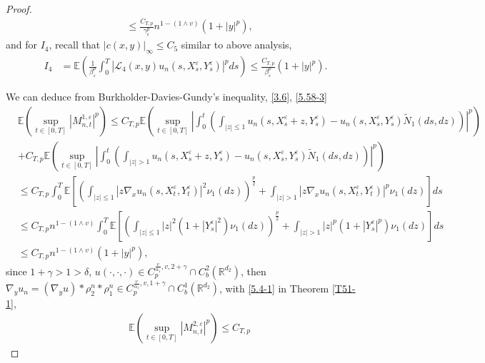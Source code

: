 \documentclass[11pt,reqno]{amsart}
\numberwithin{equation}{section}
\begin{document}
\begin{proof}
\begin{align}
		&\leq \frac{C_{T,p}}{\gamma_{\varepsilon}^{p}}n^{1-(1\wedge v)} (1+|y|^{p}),\label{5.51}
\end{align}
and for $I_{4}$, recall that $|c(x,y)|_{\infty} \leq C_{5}$ similar to above analysis,
\begin{equation}\label{5.52}
	\begin{split}
		I_{4}&=\mathbb{E}\left(\frac{1}{\beta_{\varepsilon}^{p}}\int_{0}^{T}|\mathcal{L}_{4}(x,y)u_{n}(s,X_{s}^{\varepsilon},Y_{s}^{\varepsilon})|^{p}ds\right)\leq  \frac{C_{T,p}}{\beta_{\varepsilon}^{p}} (1+|y|^{p}).
	\end{split}
\end{equation}

We can deduce from Burkholder-Davies-Gundy's inequality, \eqref{3.6}, \eqref{5.58-3}
\begin{align}
	&\mathbb{E}\left( \sup_{t\in [0,T]}|M_{n,t}^{1,\varepsilon}|^{p}\right)\leq C_{T,p}
	\mathbb{E}\left(\sup_{t\in [0,T]}\left| \int_{0}^{t}\left(\int_{|z|\leq 1}u_{n}(s,X_{s}^{\varepsilon}+z,Y_{s}^{\varepsilon})-u_{n}(s,X_{s}^{\varepsilon},Y_{s}^{\varepsilon})\tilde{N}_{1}(ds,dz) \right)\right| ^{p}\right)\nonumber\\
	&+ C_{T,p}
	\mathbb{E}\left(\sup_{t\in [0,T]}\left| \int_{0}^{t}\left(\int_{|z|> 1}u_{n}(s,X_{s}^{\varepsilon}+z,Y_{s}^{\varepsilon})-u_{n}(s,X_{s}^{\varepsilon},Y_{s}^{\varepsilon})\tilde{N}_{1}(ds,dz) \right)\right| ^{p}\right)\nonumber\\
	&\leq  C_{T,p}  \int_{0}^{T}\mathbb{E}\left[\left(\int_{|z|\leq 1}|z\nabla_{x} u_{n}(s,X_{t}^{\varepsilon},Y_{t}^{\varepsilon})|^{2}\nu_{1}(dz) \right)^{\frac{p}{2}}+\int_{|z|> 1}|z\nabla_{x} u_{n}(s,X_{t}^{\varepsilon},Y_{t}^{\varepsilon})|^{p}\nu_{1}(dz)\right]ds \nonumber\\
	&\leq C_{T,p}n^{1-(1\wedge v)}  \int_{0}^{T}\mathbb{E}\left[\left(\int_{|z|\leq 1}|z|^{2}(1+|Y_{s}^{\varepsilon}|^{2})\nu_{1}(dz) \right)^{\frac{p}{2}}+\int_{|z|> 1}|z|^{p}(1+|Y_{s}^{\varepsilon}|^{p})\nu_{1}(dz) \right]ds\nonumber\\
	& \leq C_{T,p}n^{1-(1\wedge v)}(1+|y|^{p}),\label{5.53}
\end{align}
  since $1+\gamma> 1> \delta$,   $ u(\cdot,\cdot,\cdot)\in C_{p}^{\frac{v}{\alpha_{1}},v, 2+\gamma}\cap C_{b}^{2}(\mathbb{R}^{d_{2}})$, then $ \nabla_{y}u_{n}=(\nabla_{y}u)\ast\rho_{2}^{n}\ast\rho_{1}^{n}\in C_{p}^{\frac{v}{\alpha_{1}},v, 1+\gamma}\cap C_{b}^{1}(\mathbb{R}^{d_{2}})$,  with \eqref{5.4-1} in Theorem \ref{T51-1},
\begin{align}
		&\mathbb{E}\left( \sup_{t\in [0,T]}|M_{n,t}^{2,\varepsilon}|^{p}\right)\leq C_{T,p}

\end{align}
\end{proof}
\end{document}
